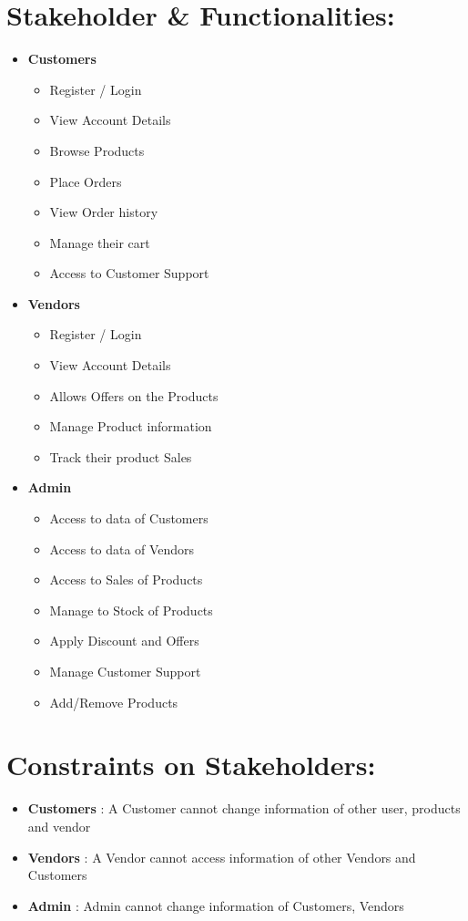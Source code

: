 \documentclass{article}
\begin{document}
\section{Stakeholder \& Functionalities:}
\begin{itemize}
\item \textbf{Customers} 
\begin{itemize}
    \item Register / Login
    \item View Account Details
    \item Browse Products
    \item Place Orders
    \item View Order history
    \item Manage their cart
    \item Access to Customer Support
\end{itemize}
\item \textbf{Vendors}
\begin{itemize}
    \item Register / Login
    \item View Account Details
    \item Allows Offers on the Products
    \item Manage Product information
    \item Track their product Sales
\end{itemize}
\item \textbf{Admin}
\begin{itemize}
    \item Access to data of Customers
    \item Access to data of Vendors
    \item Access to Sales of Products
    \item Manage to Stock of Products
    \item Apply Discount and Offers
    \item Manage Customer Support
    \item Add/Remove Products
\end{itemize}
\end{itemize}
\section{Constraints on Stakeholders:}
\begin{itemize}
    \item \textbf{Customers} : A Customer cannot change information of other user, products and vendor
    \item \textbf{Vendors} : A Vendor cannot access information of other Vendors and Customers
    \item \textbf{Admin} : Admin cannot change information of Customers, Vendors
    \end{itemize}
\end{document}

